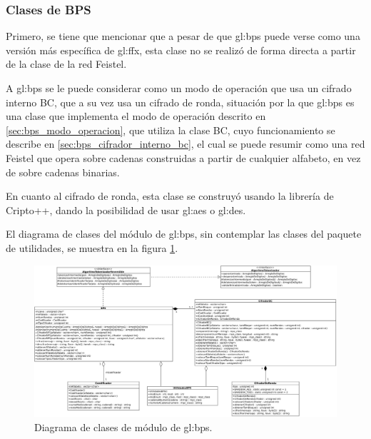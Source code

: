 %
%
%

\subsubsection{Clases de BPS}

Primero, se tiene que mencionar que a pesar de que \gls{gl:bps} puede verse como
una versión más específica de \gls{gl:ffx}, esta clase no se realizó de forma
directa a partir de la clase de la red Feistel.

A \gls{gl:bps} se le puede considerar como un modo de operación que usa un
cifrado interno BC, que a su vez usa un cifrado de ronda, situación por la que
\gls{gl:bps} es una clase que implementa el modo de operación descrito en
\ref{sec:bps_modo_operacion}, que utiliza la clase BC, cuyo funcionamiento se
describe en \ref{sec:bps_cifrador_interno_bc}, el cual se puede resumir como
una red Feistel que opera sobre cadenas construidas a partir de cualquier
alfabeto, en vez de sobre cadenas binarias.

En cuanto al cifrado de ronda, esta clase se construyó usando la librería de
Cripto++, dando la posibilidad de usar \gls{gl:aes} o \gls{gl:des}.


El diagrama de clases del módulo de \gls{gl:bps}, sin contemplar las clases del
paquete de utilidades, se muestra en la figura \ref{diagrama_clases_bps}.

\begin{figure}
  \begin{center}
    \includegraphics[width=1.0\linewidth]{diagramas/bps.png}
    \caption{Diagrama de clases de módulo de \gls{gl:bps}.}
    \label{diagrama_clases_bps}
  \end{center}
\end{figure}
